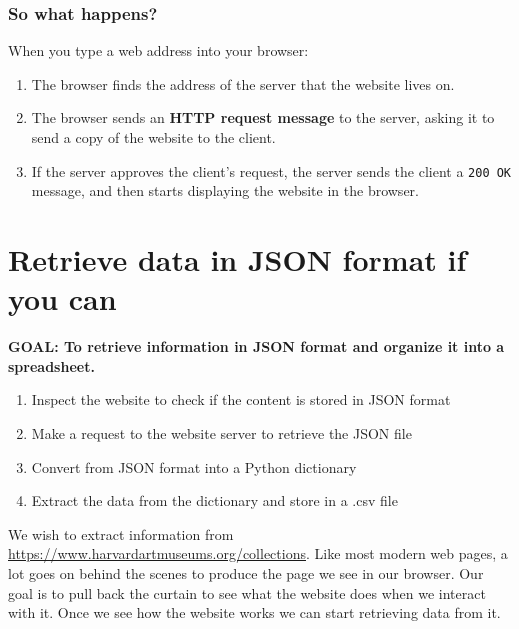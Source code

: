 \documentclass[
]{book}
\providecommand{\tightlist}{%
  \setlength{\itemsep}{0pt}\setlength{\parskip}{0pt}}
\begin{document}
\hypertarget{so-what-happens}{%
\subsubsection{So what happens?}\label{so-what-happens}}

When you type a web address into your browser:

\begin{enumerate}
\def\labelenumi{\arabic{enumi}.}
\tightlist
\item
  The browser finds the address of the server that the website lives on.
\item
  The browser sends an \textbf{HTTP request message} to the server, asking it to send a copy of the website to the client.
\item
  If the server approves the client's request, the server sends the client a \texttt{200\ OK} message, and then starts displaying the website in the browser.
\end{enumerate}

\hypertarget{retrieve-data-in-json-format-if-you-can}{%
\section{Retrieve data in JSON format if you can}\label{retrieve-data-in-json-format-if-you-can}}

\begin{alert}

\textbf{GOAL: To retrieve information in JSON format and organize it into a spreadsheet.}

\begin{enumerate}
\def\labelenumi{\arabic{enumi}.}
\tightlist
\item
  Inspect the website to check if the content is stored in JSON format
\item
  Make a request to the website server to retrieve the JSON file
\item
  Convert from JSON format into a Python dictionary
\item
  Extract the data from the dictionary and store in a .csv file
\end{enumerate}

\end{alert}

We wish to extract information from \url{https://www.harvardartmuseums.org/collections}. Like most modern web pages, a lot goes on behind the scenes to produce the page we see in our browser. Our goal is to pull back the curtain to see what the website does when we interact with it. Once we see how the website works we can start retrieving data from it.
\end{document}
